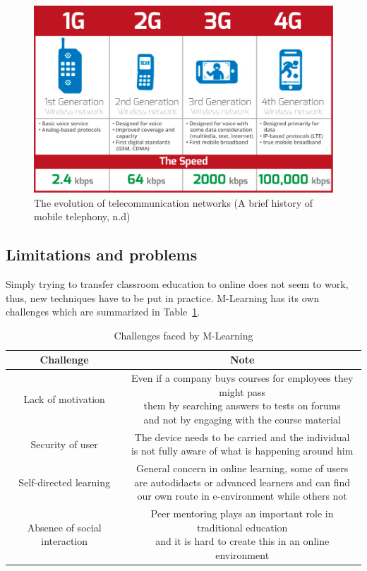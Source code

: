 \documentclass[11]{article}
\begin{document}
\begin{figure}[H]

	\includegraphics[scale = 0.45]{commNetworks.jpg}
	\caption{The evolution of telecommunication networks (A brief history of mobile telephony, n.d)}
	\label{commNet}

\end{figure}

\subsection{Limitations and problems}
	Simply trying to transfer classroom education to online does not seem to work, thus, new techniques have to be put in practice.
M-Learning has its own challenges which are summarized in Table~\ref{mLearChall}.


\begin{table}[H]
	\centering
	\caption{Challenges faced by M-Learning}
	\label{mLearChall}
	\begin{tabular}{|c|c|}
		\hline
		\textbf{ Challenge } & \textbf{Note}  \\
		\hline
		Lack of motivation & \makecell { Even if a company buys courses for employees they might pass\\ them by searching answers to tests on forums\\ and not by engaging with the course material}  \\	
		\hline
		Security of user & \makecell{The device needs to be carried and the individual\\ is not fully aware of what is happening around him}  \\	
		\hline
		Self-directed learning & \makecell{General concern in online learning, some of users\\ are autodidacts or advanced learners and can find\\ our own route in e-environment while others not}  \\	
		\hline
		Absence of social interaction & \makecell{Peer mentoring plays an important role in traditional education\\ and it is hard to create this in an online environment}\\
		\hline
	\end{tabular}
\end{table}
\end{document}
